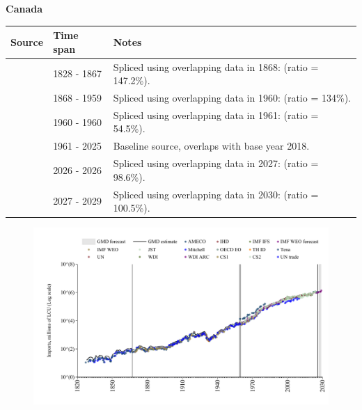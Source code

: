 \documentclass[12pt,a4paper,landscape]{article}
\begin{document}
\begin{adjustbox}{max totalsize={\paperwidth}{\paperheight},center}
\begin{minipage}[t][\textheight][t]{\textwidth}
\vspace*{0.5cm}
{}
\begin{center}
{\Large\bfseries Canada}
\end{center}
\vspace{0.5cm}
\begin{table}[H]
\centering
\small
\begin{tabular}{|l|l|l|}
\hline
\textbf{Source} & \textbf{Time span} & \textbf{Notes} \\
\hline
\rowcolor{white}\cite{Tena}& 1828 - 1867 &Spliced using overlapping data in 1868: (ratio = 147.2\%).\\
\rowcolor{lightgray}\cite{CS1_CAN}& 1868 - 1959 &Spliced using overlapping data in 1960: (ratio = 134\%).\\
\rowcolor{white}\cite{AMECO}& 1960 - 1960 &Spliced using overlapping data in 1961: (ratio = 54.5\%).\\
\rowcolor{lightgray}\cite{OECD_EO}& 1961 - 2025 &Baseline source, overlaps with base year 2018.\\
\rowcolor{white}\cite{AMECO}& 2026 - 2026 &Spliced using overlapping data in 2027: (ratio = 98.6\%).\\
\rowcolor{lightgray}\cite{IMF_WEO_forecast}& 2027 - 2029 &Spliced using overlapping data in 2030: (ratio = 100.5\%).\\
\hline
\end{tabular}
\end{table}
\begin{figure}[H]
\centering
\includegraphics[width=\textwidth,height=0.6\textheight,keepaspectratio]{graphs/CAN_imports.pdf}
\end{figure}
\end{minipage}
\end{adjustbox}
\end{document}
